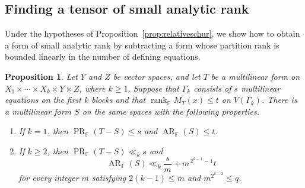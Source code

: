 \documentclass[11pt,reqno]{amsart}
\theoremstyle{plain}
\newtheorem{proposition}[theorem]{Proposition}
\theoremstyle{definition}
\newcommand{\F}{\mathbb F}
\DeclareMathOperator{\arank}{AR}
\DeclareMathOperator{\prank}{PR}
\DeclareMathOperator{\rk}{rank}
\begin{document}
\subsection{Finding a tensor of small analytic rank}
Under the hypotheses of Proposition~\ref{prop:relativeschur}, we show how to obtain a form of small analytic rank by subtracting a form whose partition rank is bounded linearly in the number of defining equations.
\begin{proposition}\label{prop:all}
Let $Y$ and $Z$ be vector spaces, and let $T$ be a multilinear form on $X_1\times\cdots\times X_k\times Y\times Z$, where $k\geq1$. Suppose that $\Gamma_k$ consists of $s$ multilinear equations on the first $k$ blocks and that $\rk_{\F}M_T(x)\leq t$ on $V(\Gamma_k)$. There is a multilinear form $S$ on the same spaces with the following properties.
\begin{enumerate}
\item[$\mathrm{(a)}$] If $k=1$, then $\prank_{\F}(T-S)\leq s$ and $\arank_{\F}(S)\leq t$.
\item[$\mathrm{(b)}$] If $k\geq2$, then $\prank_{\F}(T-S)\ll_k s$ and
\begin{equation}\label{eq:all}
 \arank_{\F}(S)\ll_k \frac{s}{m}+m^{\,2^{k-1}-1}t
\end{equation}
for every integer $m$ satisfying $2(k-1)\leq m$ and $m^{2^{k-2}}\leq q$.
\end{enumerate}
\end{proposition}
\end{document}
